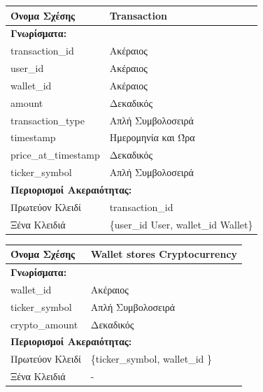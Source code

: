 \vspace{1cm}

\noindent
\begin{tabular}{|p{6cm}|p{6cm}|}
\hline
\textbf{Όνομα Σχέσης} & Transaction \\ \hline

\multicolumn{2}{|l|}{\textbf{Γνωρίσματα:}} \\ \hline
transaction\_id & Ακέραιος \\ \hline
user\_id & Ακέραιος \\ \hline
wallet\_id & Ακέραιος \\ \hline
amount & Δεκαδικός \\ \hline
transaction\_type & Απλή Συμβολοσειρά \\ \hline
timestamp & Ημερομηνία και Ώρα \\ \hline
price\_at\_timestamp & Δεκαδικός \\ \hline
ticker\_symbol & Απλή Συμβολοσειρά \\ \hline

\multicolumn{2}{|l|}{\textbf{Περιορισμοί Ακεραιότητας:}} \\ \hline
Πρωτεύον Κλειδί & transaction\_id \\ \hline
Ξένα Κλειδιά & \{user\_id User, wallet\_id Wallet\} \\ \hline
\end{tabular}


\vspace{1cm}

\noindent
\begin{tabular}{|p{6cm}|p{6cm}|}
\hline
\textbf{Όνομα Σχέσης} & Wallet stores Cryptocurrency\\ \hline

\multicolumn{2}{|l|}{\textbf{Γνωρίσματα:}} \\ \hline
wallet\_id & Ακέραιος \\ \hline
ticker\_symbol & Απλή Συμβολοσειρά \\ \hline
crypto\_amount & Δεκαδικός \\ \hline

\multicolumn{2}{|l|}{\textbf{Περιορισμοί Ακεραιότητας:}} \\ \hline
Πρωτεύον Κλειδί & \{ticker\_symbol, wallet\_id \} \\ \hline
Ξένα Κλειδιά & - \\ \hline
\end{tabular}

\vspace{1cm}

